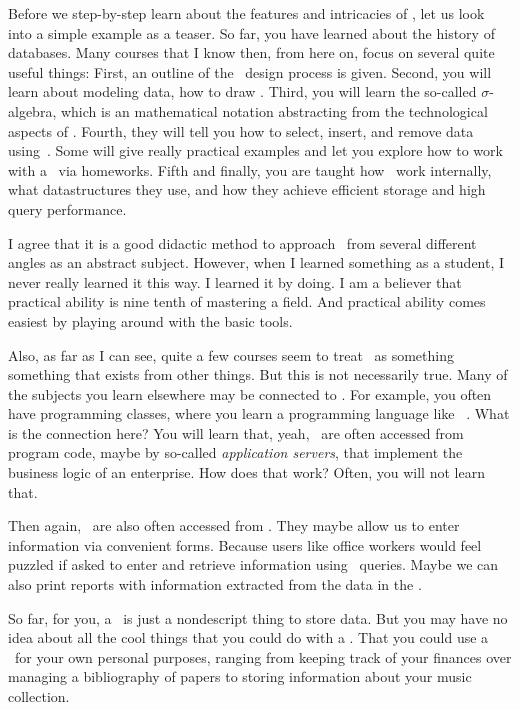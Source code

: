 Before we step-by-step learn about the features and intricacies of \dbs, let us look into a simple example as a teaser.
So far, you have learned about the history of databases.
Many courses that I know then, from here on, focus on several quite useful things:
First, an outline of the \db\ design process is given.
Second, you will learn about modeling data, how to draw .
Third, you will learn the so-called $\sigma$\nobreakdashes-algebra, which is an mathematical notation abstracting from the technological aspects of .
Fourth, they will tell you how to select, insert, and remove data using~\sql.
Some will give really practical examples and let you explore how to work with a \db\ via homeworks.
Fifth and finally, you are taught how \dbs\ work internally, what datastructures they use, and how they achieve efficient storage and high query performance.

I agree that it is a good didactic method to approach \dbs\ from several different angles as an abstract subject.
However, when I learned something as a student, I never really learned it this way.
I learned it by doing.
I am a believer that practical ability is nine tenth of mastering a field.
And practical ability comes easiest by playing around with the basic tools.

Also, as far as I can see, quite a few courses seem to treat \dbs\ as something  something that exists  from other things.
But this is not necessarily true.
Many of the subjects you learn elsewhere may be connected to \dbs.
For example, you often have programming classes, where you learn a programming language like \python~\cite{programmingWithPython}.
What is the connection here?
You will learn that, yeah, \dbs\ are often accessed from program code, maybe by so-called \emph{application servers}, that implement the business logic of an enterprise.
How does that work?
Often, you will not learn that.

Then again, \dbs\ are also often accessed from .
They maybe allow us to enter information via convenient forms.
Because users like office workers would feel puzzled if asked to enter and retrieve information using \sql\ queries.
Maybe we can also print reports with information extracted from the data in the \db.

So far, for you, a \db\ is just a nondescript thing to store data.
But you may have no idea about all the cool things that you could do with a \db.
That you could use a \db\ for your own personal purposes, ranging from keeping track of your finances over managing a bibliography of papers to storing information about your music collection.

